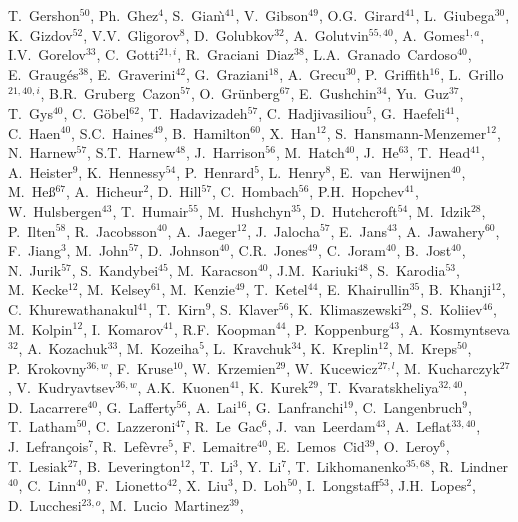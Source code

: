 \begin{flushleft}
T.~Gershon$^{50}$,
Ph.~Ghez$^{4}$,
S.~Gian{\`\i}$^{41}$,
V.~Gibson$^{49}$,
O.G.~Girard$^{41}$,
L.~Giubega$^{30}$,
K.~Gizdov$^{52}$,
V.V.~Gligorov$^{8}$,
D.~Golubkov$^{32}$,
A.~Golutvin$^{55,40}$,
A.~Gomes$^{1,a}$,
I.V.~Gorelov$^{33}$,
C.~Gotti$^{21,i}$,
R.~Graciani~Diaz$^{38}$,
L.A.~Granado~Cardoso$^{40}$,
E.~Graug{\'e}s$^{38}$,
E.~Graverini$^{42}$,
G.~Graziani$^{18}$,
A.~Grecu$^{30}$,
P.~Griffith$^{16}$,
L.~Grillo$^{21,40,i}$,
B.R.~Gruberg~Cazon$^{57}$,
O.~Gr{\"u}nberg$^{67}$,
E.~Gushchin$^{34}$,
Yu.~Guz$^{37}$,
T.~Gys$^{40}$,
C.~G{\"o}bel$^{62}$,
T.~Hadavizadeh$^{57}$,
C.~Hadjivasiliou$^{5}$,
G.~Haefeli$^{41}$,
C.~Haen$^{40}$,
S.C.~Haines$^{49}$,
B.~Hamilton$^{60}$,
X.~Han$^{12}$,
S.~Hansmann-Menzemer$^{12}$,
N.~Harnew$^{57}$,
S.T.~Harnew$^{48}$,
J.~Harrison$^{56}$,
M.~Hatch$^{40}$,
J.~He$^{63}$,
T.~Head$^{41}$,
A.~Heister$^{9}$,
K.~Hennessy$^{54}$,
P.~Henrard$^{5}$,
L.~Henry$^{8}$,
E.~van~Herwijnen$^{40}$,
M.~He{\ss}$^{67}$,
A.~Hicheur$^{2}$,
D.~Hill$^{57}$,
C.~Hombach$^{56}$,
P.H.~Hopchev$^{41}$,
W.~Hulsbergen$^{43}$,
T.~Humair$^{55}$,
M.~Hushchyn$^{35}$,
D.~Hutchcroft$^{54}$,
M.~Idzik$^{28}$,
P.~Ilten$^{58}$,
R.~Jacobsson$^{40}$,
A.~Jaeger$^{12}$,
J.~Jalocha$^{57}$,
E.~Jans$^{43}$,
A.~Jawahery$^{60}$,
F.~Jiang$^{3}$,
M.~John$^{57}$,
D.~Johnson$^{40}$,
C.R.~Jones$^{49}$,
C.~Joram$^{40}$,
B.~Jost$^{40}$,
N.~Jurik$^{57}$,
S.~Kandybei$^{45}$,
M.~Karacson$^{40}$,
J.M.~Kariuki$^{48}$,
S.~Karodia$^{53}$,
M.~Kecke$^{12}$,
M.~Kelsey$^{61}$,
M.~Kenzie$^{49}$,
T.~Ketel$^{44}$,
E.~Khairullin$^{35}$,
B.~Khanji$^{12}$,
C.~Khurewathanakul$^{41}$,
T.~Kirn$^{9}$,
S.~Klaver$^{56}$,
K.~Klimaszewski$^{29}$,
S.~Koliiev$^{46}$,
M.~Kolpin$^{12}$,
I.~Komarov$^{41}$,
R.F.~Koopman$^{44}$,
P.~Koppenburg$^{43}$,
A.~Kosmyntseva$^{32}$,
A.~Kozachuk$^{33}$,
M.~Kozeiha$^{5}$,
L.~Kravchuk$^{34}$,
K.~Kreplin$^{12}$,
M.~Kreps$^{50}$,
P.~Krokovny$^{36,w}$,
F.~Kruse$^{10}$,
W.~Krzemien$^{29}$,
W.~Kucewicz$^{27,l}$,
M.~Kucharczyk$^{27}$,
V.~Kudryavtsev$^{36,w}$,
A.K.~Kuonen$^{41}$,
K.~Kurek$^{29}$,
T.~Kvaratskheliya$^{32,40}$,
D.~Lacarrere$^{40}$,
G.~Lafferty$^{56}$,
A.~Lai$^{16}$,
G.~Lanfranchi$^{19}$,
C.~Langenbruch$^{9}$,
T.~Latham$^{50}$,
C.~Lazzeroni$^{47}$,
R.~Le~Gac$^{6}$,
J.~van~Leerdam$^{43}$,
A.~Leflat$^{33,40}$,
J.~Lefran{\c{c}}ois$^{7}$,
R.~Lef{\`e}vre$^{5}$,
F.~Lemaitre$^{40}$,
E.~Lemos~Cid$^{39}$,
O.~Leroy$^{6}$,
T.~Lesiak$^{27}$,
B.~Leverington$^{12}$,
T.~Li$^{3}$,
Y.~Li$^{7}$,
T.~Likhomanenko$^{35,68}$,
R.~Lindner$^{40}$,
C.~Linn$^{40}$,
F.~Lionetto$^{42}$,
X.~Liu$^{3}$,
D.~Loh$^{50}$,
I.~Longstaff$^{53}$,
J.H.~Lopes$^{2}$,
D.~Lucchesi$^{23,o}$,
M.~Lucio~Martinez$^{39}$,

\end{flushleft}

